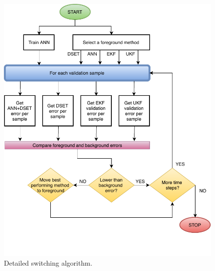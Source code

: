 \documentclass[12pt]{uthesis-v12}  %
\begin{document}
\begin{figure}[!t]
\centering
\includegraphics[width=4.5in]{switching1}
\caption{Detailed switching algorithm.}
\label{switching-fig}
\end{figure}
\end{document}
